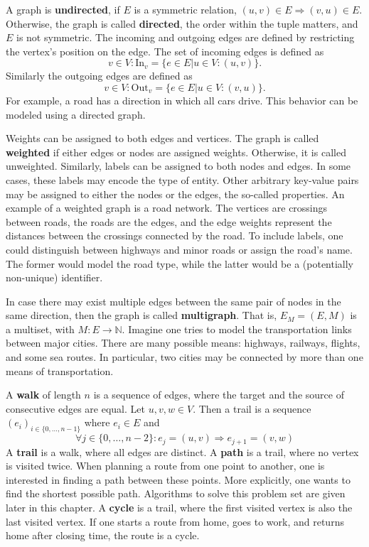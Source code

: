         A graph is \textbf{undirected}, if $E$ is a symmetric relation, $(u, v) \in E \Rightarrow (v, u) \in E$. 
        Otherwise, the graph is called \textbf{directed}, the order within the tuple matters, and $E$ is not symmetric.             
        The incoming and outgoing edges are defined by restricting the vertex's position on the edge. 
        The set of incoming edges is defined as
        \[v \in V: \text{In}_v = \{e \in E |u \in V: (u, v) \}.\]
        Similarly the outgoing edges are defined as 
        \[v \in V: \text{Out}_v = \{e \in E |u \in V: (v, u) \}.
        \]
        For example, a road has a direction in which all cars drive. 
        This behavior can be modeled using a directed graph.
        
        Weights can be assigned to both edges and vertices. The graph is called \textbf{weighted} if either edges or nodes are assigned weights.
        Otherwise, it is called unweighted.
        Similarly, labels can be assigned to both nodes and edges. 
        In some cases, these labels may encode the type of entity.
        Other arbitrary key-value pairs may be assigned to either the nodes or the edges, the so-called properties.           
        An example of a weighted graph is a road network.
        The vertices are crossings between roads, the roads are the edges, and the edge weights represent the distances between the crossings connected by the road.
        To include labels, one could distinguish between highways and minor roads or assign the road's name. 
        The former would model the road type, while the latter would be a (potentially non-unique) identifier.
        
        In case there may exist multiple edges between the same pair of nodes in the same direction, then the graph is called \textbf{multigraph}. 
        That is, $E_M = (E, M)$ is a multiset, with $M: E \rightarrow \mathbb{N}$. 
        Imagine one tries to model the transportation links between major cities. 
        There are many possible means: highways, railways, flights, and some sea routes. 
        In particular, two cities may be connected by more than one means of transportation.
        
        A \textbf{walk} of length $n$ is a sequence of edges, where the target and the source of consecutive edges are equal. Let $u,v,w \in V$. Then a trail is a sequence $(e_i)_{i \in \{0, \dots, n-1\}}$ where $e_i \in E$ and
        \[ \forall j \in \{0, \dots, n-2\}: e_j = (u, v) \Rightarrow e_{j+1} = (v, w)\] 
        A \textbf{trail} is a walk, where all edges are distinct. 
        A \textbf{path} is a trail, where no vertex is visited twice.
        When planning a route from one point to another, one is interested in finding a path between these points.
        More explicitly, one wants to find the shortest possible path. 
        Algorithms to solve this problem set are given later in this chapter. A \textbf{cycle} is a trail, where the first visited vertex is also the last visited vertex. 
        If one starts a route from home, goes to work, and returns home after closing time, the route is a cycle.
        
